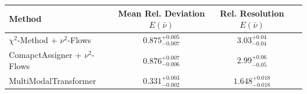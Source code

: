     \begin{tabular}{lccc}
        \toprule
        Method & Mean Rel. Deviation $E(\bar{\nu})$ & Rel. Resolution $E(\bar{\nu})$ \\
        \midrule
        $\chi^2$-Method + $\nu^2$-Flows & $0.875^{+0.005}_{-0.007}$ & $3.03^{+0.04}_{-0.04}$ \\
        ComapctAssigner + $\nu^2$-Flows & $0.876^{+0.007}_{-0.006}$ & $2.99^{+0.06}_{-0.05}$ \\
        MultiModalTransformer & $0.331^{+0.003}_{-0.002}$ & $1.648^{+0.018}_{-0.018}$ \\
        \bottomrule
    \end{tabular}